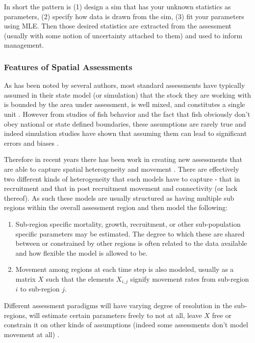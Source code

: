 \documentclass[11pt]{article}
\begin{document}
In short the pattern is (1) design a sim that has your unknown statistics as parameters, (2) specify how data is drawn from the sim, (3) fit your parameters using MLE. Then those desired statistics are extracted from the assessment (usually with some notion of uncertainty attached to them) and used to inform management. 

\subsubsection{Features of Spatial Assessments}

As has been noted by several authors, most standard assessments have typically assumed in their state model (or simulation) that the stock they are working with is bounded by the area under assessment, is well mixed, and constitutes a single unit \cite{sippel2014} \cite{punt2019} \cite{goethel2023}. However from studies of fish behavior and the fact that fish obviously don't obey national or state defined boundaries, these assumptions are rarely true and indeed simulation studies have shown that assuming them can lead to significant errors and biases \cite{lorenzen2010}. 

Therefore in recent years there has been work in creating new assessments that are able to capture spatial heterogeneity and movement \cite{punt2019} \cite{cadrin2020}. There are effectively two different kinds of heterogeneity that such models have to capture - that in recruitment and that in post recruitment movement and connectivity (or lack thereof). As such these models are usually structured as having multiple sub regions within the overall assessment region and then model the following:

\begin{enumerate}
\item Sub-region specific mortality, growth, recruitment, or other sub-population specific parameters may be estimated. The degree to which these are shared between or constrained by other regions is often related to the data available and how flexible the model is allowed to be.
\item Movement among regions at each time step is also modeled, usually as a matrix $X$ such that the elements $X_{i,j}$ signify movement rates from sub-region $i$ to sub-region $j$. 
\end{enumerate} 

Different assessment paradigms will have varying degree of resolution in the sub-regions, will estimate certain parameters freely to not at all, leave $X$ free or constrain it on other kinds of assumptions (indeed some assessments don't model movement at all) \cite{punt2019} \cite{goethel2023}. 
\end{document}
